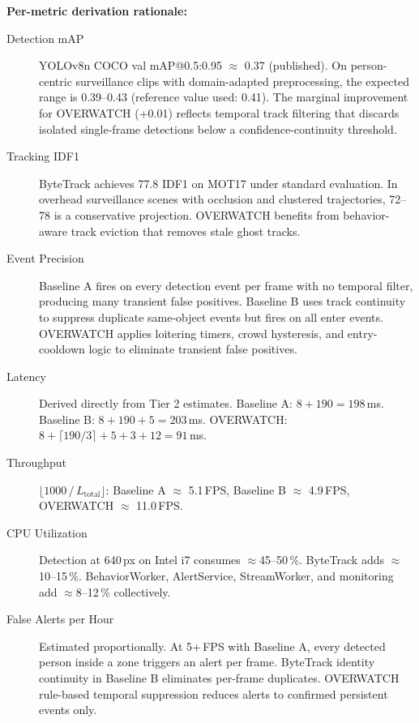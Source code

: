 \documentclass[11pt]{article}
\begin{document}
\textbf{Per-metric derivation rationale:}
\begin{description}
\item[Detection mAP] YOLOv8n COCO val mAP@0.5:0.95 $\approx$ 0.37 (published). On person-centric surveillance clips with domain-adapted preprocessing, the expected range is 0.39--0.43 (reference value used: 0.41). The marginal improvement for OVERWATCH (+0.01) reflects temporal track filtering that discards isolated single-frame detections below a confidence-continuity threshold.
\item[Tracking IDF1] ByteTrack achieves 77.8 IDF1 on MOT17 under standard evaluation. In overhead surveillance scenes with occlusion and clustered trajectories, 72--78 is a conservative projection. OVERWATCH benefits from behavior-aware track eviction that removes stale ghost tracks.
\item[Event Precision] Baseline A fires on every detection event per frame with no temporal filter, producing many transient false positives. Baseline B uses track continuity to suppress duplicate same-object events but fires on all enter events. OVERWATCH applies loitering timers, crowd hysteresis, and entry-cooldown logic to eliminate transient false positives.
\item[Latency] Derived directly from Tier 2 estimates. Baseline A: $8+190 = 198$\,ms. Baseline B: $8+190+5 = 203$\,ms. OVERWATCH: $8+\lceil 190/3 \rceil +5+3+12 = 91$\,ms.
\item[Throughput] $\lfloor 1000\,/\,L_{\text{total}} \rfloor$: Baseline A $\approx$ 5.1\,FPS, Baseline B $\approx$ 4.9\,FPS, OVERWATCH $\approx$ 11.0\,FPS.
\item[CPU Utilization] Detection at 640\,px on Intel i7 consumes $\approx$45--50\,\%. ByteTrack adds $\approx$10--15\,\%. BehaviorWorker, AlertService, StreamWorker, and monitoring add $\approx$8--12\,\% collectively.
\item[False Alerts per Hour] Estimated proportionally. At 5+\,FPS with Baseline A, every detected person inside a zone triggers an alert per frame. ByteTrack identity continuity in Baseline B eliminates per-frame duplicates. OVERWATCH rule-based temporal suppression reduces alerts to confirmed persistent events only.
\end{description}
\end{document}
